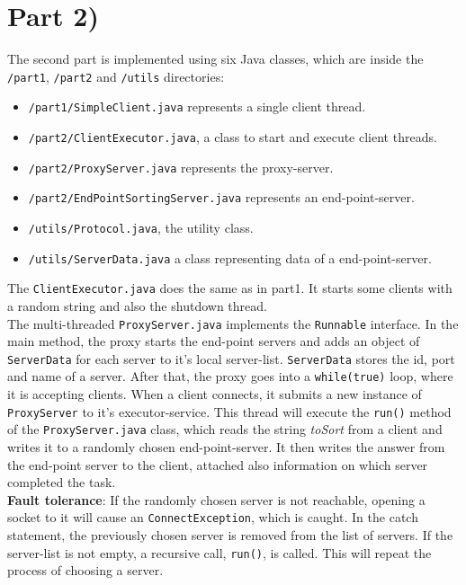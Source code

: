 \documentclass{article}
\begin{document}
  \section*{Part 2)} 
    
    The second part is implemented using six Java classes, which are inside the \texttt{/part1}, \texttt{/part2} and \texttt{/utils} directories:
    \begin{itemize}
      \item \texttt{/part1/SimpleClient.java} represents a single client thread.
      \item \texttt{/part2/ClientExecutor.java}, a class to start and execute client threads.
      \item \texttt{/part2/ProxyServer.java} represents the proxy-server.
      \item \texttt{/part2/EndPointSortingServer.java} represents an end-point-server.
      \item \texttt{/utils/Protocol.java}, the utility class.
      \item \texttt{/utils/ServerData.java} a class representing data of a end-point-server.
    \end{itemize}
    The \texttt{ClientExecutor.java} does the same as in part1. It starts some clients with a random string and also the shutdown thread.\\
    The multi-threaded \texttt{ProxyServer.java} implements the \texttt{Runnable} interface. In the main method, the proxy starts the end-point servers and adds an object of \texttt{ServerData} for each server to it's local server-list. \texttt{ServerData} stores the id, port and name of a server. After that, the proxy goes into a \texttt{while(true)} loop, where it is accepting clients. When a client connects, it submits a new instance of \texttt{ProxyServer} to it's executor-service. This thread will execute the \texttt{run()} method of the \texttt{ProxyServer.java} class, which reads the string \textit{toSort} from a client and writes it to a randomly chosen end-point-server. It then writes the answer from the end-point server to the client, attached also information on which server completed the task.\\
    \textbf{Fault tolerance}: If the randomly chosen server is not reachable, opening a socket to it will cause an \texttt{ConnectException}, which is caught. In the catch statement, the previously chosen server is removed from the list of servers. If the server-list is not empty, a recursive call, \texttt{run()}, is called. This will repeat the process of choosing a server.\\
\end{document}
